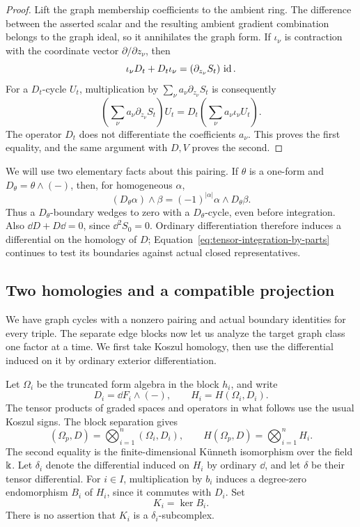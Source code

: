 \begin{proof}
Lift the graph membership coefficients to the ambient ring.
The difference between the asserted scalar and the resulting ambient
gradient combination belongs to the graph ideal, so it annihilates the
graph form.  If \(\iota_\nu\) is contraction with the coordinate vector
\(\partial/\partial z_\nu\), then
\[
 \iota_\nu D_t+D_t\iota_\nu
                =(\partial_{z_\nu}S_t)\,\operatorname{id}.
\]
For a \(D_t\)-cycle \(U_t\), multiplication by
\(\sum_\nu a_\nu\partial_{z_\nu}S_t\) is consequently
\[
 \left(\sum_\nu a_\nu\partial_{z_\nu}S_t\right)U_t
       =D_t\left(\sum_\nu a_\nu\iota_\nu U_t\right).
\]
The operator \(D_t\) does not differentiate the coefficients \(a_\nu\).
This proves the first equality, and the same argument with \(D,V\)
proves the second.
\end{proof}

We will use two elementary facts about this pairing.  If
\(\theta\) is a one-form and \(D_\theta=\theta\wedge(-)\), then, for
homogeneous \(\alpha\),
\begin{equation}\label{eq:tensor-wedge-adjoint}
 (D_\theta\alpha)\wedge\beta
          =(-1)^{|\alpha|}\alpha\wedge D_\theta\beta.
\end{equation}
Thus a \(D_\theta\)-boundary wedges to zero with a
\(D_\theta\)-cycle, even before integration.
Also \(\dd D+D\dd=0\), since \(\dd^2S_0=0\).
Ordinary differentiation therefore induces a differential on the
homology of \(D\); Equation~\eqref{eq:tensor-integration-by-parts}
continues to test its boundaries against actual closed representatives.

\subsection{Two homologies and a compatible projection}

We have graph cycles with a nonzero pairing and actual boundary
identities for every triple. The separate edge blocks now let us
analyze the target graph class one factor at a time. We first take
Koszul homology, then use the differential induced on it by ordinary
exterior differentiation.

Let \(\Omega_i\) be the truncated form algebra in the block \(h_i\), and
write
\[
 D_i=\dd F_i\wedge(-),\qquad H_i=H(\Omega_i,D_i).
\]
The tensor products of graded spaces and operators in what follows use
the usual Koszul signs.  The block separation gives
\[
 (\Omega_p,D)=\bigotimes_{i=1}^n(\Omega_i,D_i),\qquad
 H(\Omega_p,D)=\bigotimes_{i=1}^n H_i .
\]
The second equality is the finite-dimensional Künneth isomorphism over
the field \(\Bbbk\).
Let \(\delta_i\) denote the differential induced on \(H_i\) by ordinary
\(\dd\), and let \(\delta\) be their tensor differential.
For \(i\in I\), multiplication by \(b_i\) induces a degree-zero
endomorphism \(B_i\) of \(H_i\), since it commutes with \(D_i\).
Set
\[
                         K_i=\ker B_i .
\]
There is no assertion that \(K_i\) is a \(\delta_i\)-subcomplex.

